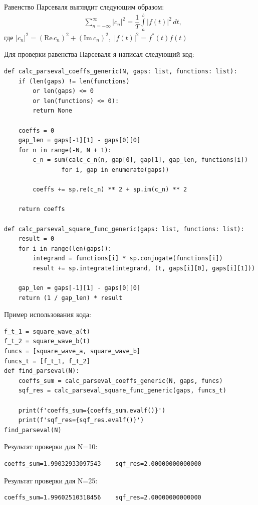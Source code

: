 \documentclass[a4paper, 16pt]{article}
\begin{document}
\newpage
\noindent Равенство Парсеваля выглядит следующим образом:
\begin{align*}
    & \sum_{n=-\infty}^{\infty}|c_n|^2=\dfrac{1}{T}\int\limits_{a}^{b}|f(t)|^2\,dt,
\end{align*}
\noindent где $|c_n|^2=(\text{Re}\,c_n)^2+(\text{Im}\,c_n)^2,\,\,|f(t)|^2=f^{*}(t)f(t)$

\noindent Для проверки равенства Парсеваля я написал следующий код:
\begin{lstlisting}
def calc_parseval_coeffs_generic(N, gaps: list, functions: list):
    if (len(gaps) != len(functions) 
        or len(gaps) <= 0 
        or len(functions) <= 0):
        return None
        
    coeffs = 0
    gap_len = gaps[-1][1] - gaps[0][0]
    for n in range(-N, N + 1):
        c_n = sum(calc_c_n(n, gap[0], gap[1], gap_len, functions[i]) 
                for i, gap in enumerate(gaps))
            
        coeffs += sp.re(c_n) ** 2 + sp.im(c_n) ** 2

    return coeffs

def calc_parseval_square_func_generic(gaps: list, functions: list):
    result = 0
    for i in range(len(gaps)):
        integrand = functions[i] * sp.conjugate(functions[i])
        result += sp.integrate(integrand, (t, gaps[i][0], gaps[i][1]))
        
    gap_len = gaps[-1][1] - gaps[0][0]
    return (1 / gap_len) * result
\end{lstlisting}


\noindent Пример использования кода:
\begin{lstlisting}
f_t_1 = square_wave_a(t)
f_t_2 = square_wave_b(t)
funcs = [square_wave_a, square_wave_b]
funcs_t = [f_t_1, f_t_2]
def find_parseval(N):
    coeffs_sum = calc_parseval_coeffs_generic(N, gaps, funcs)
    sqf_res = calc_parseval_square_func_generic(gaps, funcs_t)

    print(f'coeffs_sum={coeffs_sum.evalf()}')
    print(f'sqf_res={sqf_res.evalf()}')
find_parseval(N)
\end{lstlisting}


\noindent Результат проверки для N=10:
\begin{lstlisting}
coeffs_sum=1.99032933097543    sqf_res=2.00000000000000
\end{lstlisting}


\noindent Результат проверки для N=25:
\begin{lstlisting}
coeffs_sum=1.99602510318456    sqf_res=2.00000000000000
\end{lstlisting}
\end{document}
